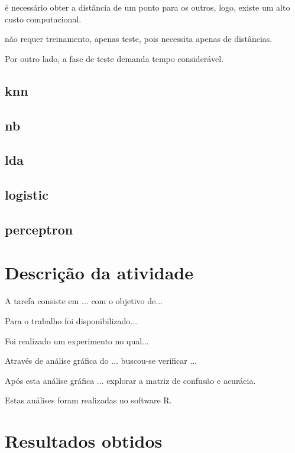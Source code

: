\documentclass[
	12pt,				%
	openright,			%
	twoside,			%
	a4paper,			%
	english,			%
	brazil,				%
	svgnames
	]{abntex2}\usepackage[]{graphicx}\usepackage[]{color}
\begin{document}
é necessário obter a distância de um ponto para os outros, logo, existe um alto custo computacional. 

não requer treinamento, apenas teste, pois necessita apenas de distâncias. 

Por outro lado, a fase de teste demanda tempo considerável.

\section{knn}

\section{nb}

\section{lda}

\section{logistic}

\section{perceptron}

\chapter{Descrição da atividade}
\label{cap:descricao}


A tarefa consiste em ... com o objetivo de...

Para o trabalho foi disponibilizado... 

Foi realizado um experimento no qual...



Através de análise gráfica do ... buscou-se verificar ... 

Após esta análise gráfica ... explorar a matriz de confusão e acurácia. 

Estas análises foram realizadas no software R.


\chapter{Resultados obtidos}
\label{cap:resultados}
\end{document}
